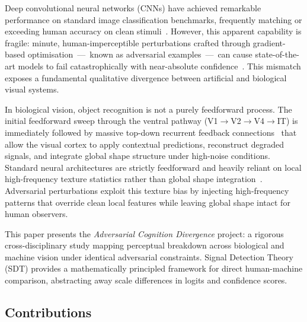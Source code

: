 \documentclass[12pt,a4paper]{article}
\begin{document}
Deep convolutional neural networks (CNNs) have achieved remarkable performance
on standard image classification benchmarks, frequently matching or exceeding
human accuracy on clean stimuli~\citep{he2016deep,tan2019efficientnet}.
However, this apparent capability is fragile: minute, human-imperceptible
perturbations crafted through gradient-based optimisation~---~known as
adversarial examples~---~can cause state-of-the-art models to fail
catastrophically with near-absolute
confidence~\citep{goodfellow2015explaining,madry2018towards}.
This mismatch exposes a fundamental qualitative divergence between artificial
and biological visual systems.

In biological vision, object recognition is not a purely feedforward process.
The initial feedforward sweep through the ventral pathway
(V1$\!\to$V2$\!\to$V4$\!\to$IT) is immediately followed by massive top-down
recurrent feedback connections~\citep{dicarlo2007untangling} that allow the
visual cortex to apply contextual predictions, reconstruct degraded signals,
and integrate global shape structure under high-noise conditions.
Standard neural architectures are strictly feedforward and heavily reliant
on local high-frequency texture statistics rather than global shape
integration~\citep{geirhos2019imagenet,brendel2019approximating}.
Adversarial perturbations exploit this texture bias by injecting
high-frequency patterns that override clean local features while leaving
global shape intact for human observers.

This paper presents the \textit{Adversarial Cognition Divergence} project:
a rigorous cross-disciplinary study mapping perceptual breakdown across
biological and machine vision under identical adversarial constraints.
Signal Detection Theory (SDT) provides a mathematically principled framework
for direct human-machine comparison, abstracting away scale differences in
logits and confidence scores.

\subsection*{Contributions}
\end{document}
